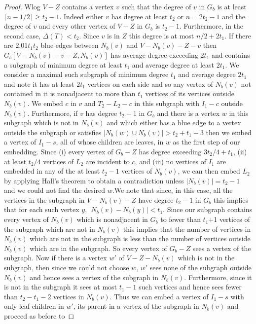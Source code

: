 \documentclass[11pt]{article}
\begin{document}
\begin{proof}
Wlog $V-Z$ contains a vertex $v$ such that the degree of $v$  in $G_b$ is at least $\lceil n-1/2 \rceil \ge t_2-1$. Indeed either $v$ has degree at least $t_2$ or $n=2t_2-1$  and the degree of $v$ and every other vertex of $V-Z$ in $G_b$ is  $t_2-1$. Furthermore, in the second case, $\Delta(T)<t_2$.
Since $v$ is in $Z$ this  degree is at most $n/2+2t_1$.   If there 
are $2.01t_1t_2$ blue  edges between $N_b(v)$ and $V-N_b(v)-Z-v$ then $G_b[V-N_b(v)-v-Z,N_b(v)]$ has average degree exceeding $2t_1$ and contains a subgraph of minimum degree at least $t_1$ and average degree at least $2t_1$. We consider a maximal such subgraph of minimum degree $t_1$ and average degree $2t_1$ and note it  has at least $2t_1$ vertices on each side and so any vertex of $N_b(v)$ not contained in it is nonadjacent to more than $t_1$ vertices of its vertices outside $N_b(v)$. We embed $c$ in $v$ and $T_2-L_2-c$ in this subgraph with $I_1-c$ outside 
$N_b(v)$. Furthermore, if $v$ has degree $t_2-1$ in $G_b$ and there is a vertex $w$  in this subgraph which is not in $N_b(v)$ and which either has a blue edge to a vertex outside the subgraph or satisfies $|N_b(w) \cup N_b(v)|> t_2+t_1-3$
then we embed a vertex of $I_1-s$, all of whose children are leaves,  in $w$ as the first step of our embedding.  Since (i) every vertex of $G_b-Z$ has degree exceeding  $3t_2/4+t_1$, 
(ii) at least  $t_2/4$ vertices of $L_2$ are incident to $c$, and (iii) no vertices of $I_1$ are embedded in any of the at
least $t_2-1$ vertices of $N_b(v)$,  we can then embed $L_2$ by applying Hall's theorem to obtain a contradiction unless $|N_b(v)|=t_2-1$
and we could not find the desired $w$.We note that since, in this case,  all the vertices in the subgraph in $V-N_b(v)-Z$ have degree $t_2-1$ in $G_b$  this implies 
that for each such vertex $y$, $|N_b(v)-N_b(y)|<t_1$. Since our subgraph contains every vertex of $N_b(v)$ which is nonadjacent  in $G_b$ to 
fewer than $t_1$+1 vertices of the subgraph which are not in $N_b(v)$ this implies that the number of vertices 
in $N_b(v)$ which are not in the subgraph is less than the number of vertices outside $N_b(v)$ which are in the subgraph.
So every vertex of $G_b-Z$ sees a vertex of the subgraph. Now if there is a vertex $w'$ of  $V-Z-N_b(v)$  which is  not in the subgraph, then since we could not choose $w$,  $w'$ sees none of the subgraph outside $N_b(v)$ and hence sees a vertex of the subgraph in  $N_b(v)$. Furthermore, since it is not in the subgraph it sees at most $t_1-1$ such vertices and hence sees fewer than $t_2-t_1-2$   vertices in $N_b(v)$. 
Thus we can  embed a vertex of $I_1-s$ with only leaf children in $w'$, its parent in a vertex of the subgraph in $N_b(v)$ and proceed as before to 

\end{proof}
\end{document}
